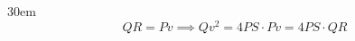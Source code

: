 \documentclass[border=4pt]{standalone}
\begin{document}
\begin{varwidth}{30em}
\large
\[ QR = Pv \implies Qv^2 = 4PS\cdot Pv = 4PS\cdot QR \]

\end{varwidth}
\end{document}
